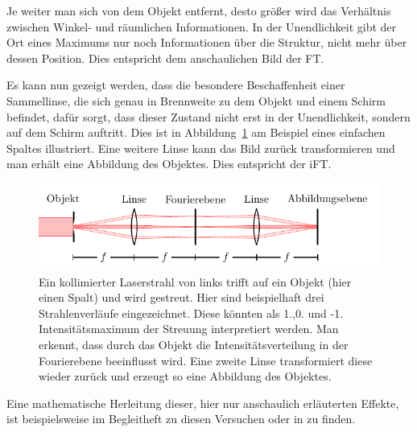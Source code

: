 Je weiter man sich von dem Objekt entfernt, desto größer wird das Verhältnis zwischen Winkel- und räumlichen Informationen. In der Unendlichkeit gibt der Ort eines Maximums nur noch Informationen über die Struktur, nicht mehr über dessen Position. Dies entspricht dem anschaulichen Bild der FT.

Es kann nun gezeigt werden, dass die besondere Beschaffenheit einer Sammellinse, die sich genau in Brennweite zu dem Objekt und einem Schirm befindet, dafür sorgt, dass dieser Zustand nicht erst in der Unendlichkeit, sondern auf dem Schirm auftritt. Dies ist in Abbildung~\ref{fig:ft-an-linse} am Beispiel eines einfachen Spaltes illustriert. Eine weitere Linse kann das Bild zurück transformieren und man erhält eine Abbildung des Objektes. Dies entspricht der iFT.

\begin{figure}[h]
	\centering
	\includegraphics[scale=1]{graphs/theorie/abbildung.pdf}
	\caption[Illustration: Inverse und Fouriertransformation an Linsen]{
		Ein kollimierter Laserstrahl von links trifft auf ein Objekt (hier einen Spalt) und wird gestreut. Hier sind beispielhaft drei Strahlenverläufe eingezeichnet. Diese könnten als 1.,0. und -1. Intensitätsmaximum der Streuung interpretiert werden. Man erkennt, dass durch das Objekt die Intensitätsverteilung in der Fourierebene beeinflusst wird. Eine zweite Linse transformiert diese wieder zurück und erzeugt so eine Abbildung des Objektes.
	} \label{fig:ft-an-linse}
\end{figure}


Eine mathematische Herleitung dieser, hier nur anschaulich erläuterten Effekte, ist beispielsweise im Begleitheft zu diesen Versuchen oder in \cite[Kap. 2.3]{stossel_fourieroptik:_1993} zu finden.

